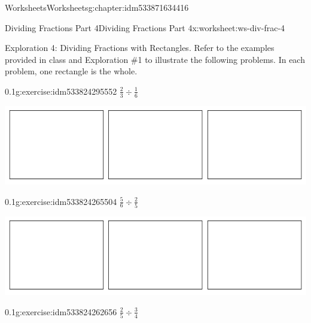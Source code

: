 \documentclass[twoside,11pt,]{book}
\begin{document}
\begin{chapterptx}{Worksheets}{}{Worksheets}{}{}{g:chapter:idm533871634416}
%
\begin{worksheet-section-numberless}{Dividing Fractions Part 4}{}{Dividing Fractions Part 4}{}{}{x:worksheet:ws-div-frac-4}
\begin{introduction}{}%
Exploration 4: Dividing Fractions with Rectangles.  Refer to the examples provided in class and Exploration \#1 to illustrate the following problems.  In each problem, one rectangle is the whole.%
\end{introduction}%
\begin{divisionexercise}{1}{}{0.1}{g:exercise:idm533824295552}%
\(\frac{2}{3} \div \frac{1}{6} \)%
\begin{sidebyside}{1}{0.1}{0.1}{0}%
\begin{sbspanel}{0.8}%
\includegraphics[width=1\linewidth]{images/3-rectangles.png}
\end{sbspanel}%
\end{sidebyside}%
\end{divisionexercise}%
\begin{divisionexercise}{2}{}{0.1}{g:exercise:idm533824265504}%
\(\frac{5}{6} \div \frac{2}{5} \)%
\begin{sidebyside}{1}{0.1}{0.1}{0}%
\begin{sbspanel}{0.8}%
\includegraphics[width=1\linewidth]{images/3-rectangles.png}
\end{sbspanel}%
\end{sidebyside}%
\end{divisionexercise}%
\begin{divisionexercise}{3}{}{0.1}{g:exercise:idm533824262656}%
\(\frac{2}{5} \div \frac{3}{4} \)%
\begin{sidebyside}{1}{0.1}{0.1}{0}%
\begin{sbspanel}{0.8}%

\end{sbspanel}
\end{sidebyside}
\end{divisionexercise}
\end{worksheet-section-numberless}
\end{chapterptx}
\end{document}
